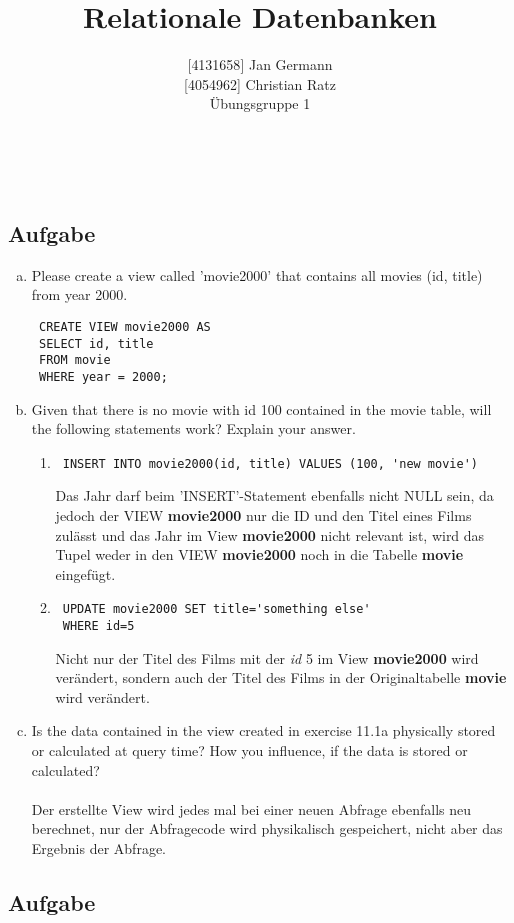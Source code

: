 \documentclass[11pt,a4paper,DIV=9]{scrartcl}
\author{{[}4131658{]} Jan Germann \\{[}4054962{]} Christian Ratz\\Übungsgruppe 1}
\title{Relationale Datenbanken}
\newcounter{temp}
\newcommand{\aufgabe}[1]{
  \setcounter{temp}{\value{subsection}}
  \setcounter{subsection}{#1}
  \addtocounter{subsection}{-1}
  \subsection{Aufgabe}
  \setcounter{subsection}{\value{temp}}
}
\renewcommand{\author}[1]{\renewcommand{\author}{#1}}
\renewcommand{\title}[1]{\renewcommand{\title}{#1}}
\newcommand{\makehomeworktitle}{
  \begin{minipage}[t]{6.5cm}
    \sf{\author}
  \end{minipage}
  \begin{minipage}[t]{6.5cm}
    \begin{flushright}
      \sf{\title\\\today}
    \end{flushright}
  \end{minipage}
  \\[0.2cm]
  \begin{center}
    \sf{
      \color{blue}{
        \LARGE{Aufgabenblatt \blattnr}
      }
    }
  \end{center}
  \vspace{0.1cm}
}
\begin{document}
\makehomeworktitle
   \aufgabe{1}
     \begin{enumerate}[a.]
 \item Please create a view called 'movie2000' that contains all movies (id, title) from year 2000.
 \begin{lstlisting}
 CREATE VIEW movie2000 AS
 SELECT id, title
 FROM movie
 WHERE year = 2000;
 \end{lstlisting}
 \item Given that there is no movie with id 100 contained in the movie table, will the following statements work? Explain your answer.
 \begin{enumerate}[1.]
 \item 
 \begin{lstlisting}
 INSERT INTO movie2000(id, title) VALUES (100, 'new movie')
 \end{lstlisting}
 Das Jahr darf beim 'INSERT'-Statement ebenfalls nicht NULL sein, da jedoch der VIEW \textbf{movie2000} nur die ID und den Titel eines Films zul\"asst und das Jahr im View \textbf{movie2000} nicht relevant ist, wird das Tupel weder in den VIEW \textbf{movie2000} noch in die Tabelle \textbf{movie} eingef\"ugt. 
 \item 
 \begin{lstlisting}
 UPDATE movie2000 SET title='something else'
 WHERE id=5
 \end{lstlisting}
 Nicht nur der Titel des Films mit der \textit{id} 5 im View \textbf{movie2000} wird ver\"andert, sondern auch der Titel des Films in der Originaltabelle \textbf{movie} wird ver\"andert.
 \end{enumerate}
 \item Is the data contained in the view created in exercise 11.1a physically stored or calculated at query time? How you influence, if the data is stored or calculated? \\\\
 Der erstellte View wird jedes mal bei einer neuen Abfrage ebenfalls neu berechnet, nur der Abfragecode wird physikalisch gespeichert, nicht aber das Ergebnis der Abfrage.
 \end{enumerate}
\aufgabe{2}
\end{document}
